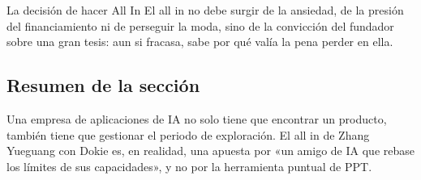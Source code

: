 \begin{importantbox}{La decisión de hacer All In}
El all in no debe surgir de la ansiedad, de la presión del financiamiento ni de perseguir la moda, sino de la convicción del fundador sobre una gran tesis: aun si fracasa, sabe por qué valía la pena perder en ella.
\end{importantbox}

\subsection{Resumen de la sección}

Una empresa de aplicaciones de IA no solo tiene que encontrar un producto, también tiene que gestionar el periodo de exploración. El all in de Zhang Yueguang con Dokie es, en realidad, una apuesta por «un amigo de IA que rebase los límites de sus capacidades», y no por la herramienta puntual de PPT.
